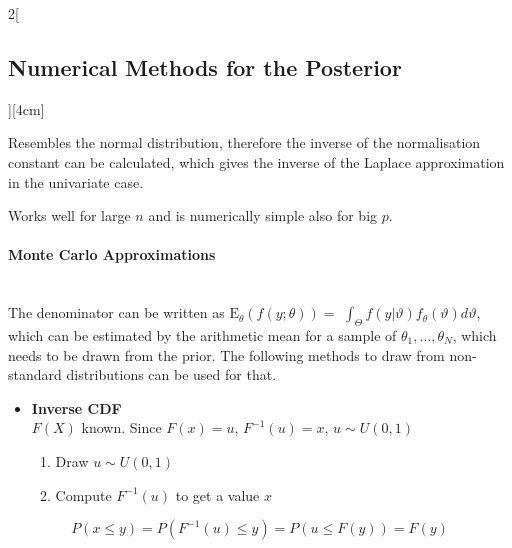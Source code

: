 \documentclass[8pt]{extarticle}
\begin{document}
\begin{multicols}{2}[\subsection{Numerical Methods for the Posterior}][4cm]
\begin{Proof}
\noindent Resembles the normal distribution, therefore the inverse of the normalisation constant can be calculated, which gives the inverse of the Laplace approximation in the univariate case.
\end{Proof}

\noindent Works well for large $n$ and is numerically simple also for big $p$.

\paragraph{Monte Carlo Approximations} \ \\

\noindent The denominator can be written as $\mathrm{E}_\theta(f(y;\theta)) =$ $ \int_\Theta f(y|\vartheta)f_\theta(\vartheta)d\vartheta$, which  can be estimated by the arithmetic mean for a sample of $\theta_1,...,\theta_N$, which needs to be drawn from the prior. The following methods to draw from non-standard distributions can be used for that.

\begin{itemize}
\item \textbf{Inverse CDF} \\
$F(X)$ known. Since $F(x)=u$, $F^{-1}(u)=x$, $u \sim U(0,1)$ \\
\vspace{-0.5em}
\begin{enumerate}
\item Draw $u \sim U(0,1)$
\item Compute $F^{-1}(u)$ to get a value $x$
\end{enumerate}
\end{itemize}
\begin{Proof}
\vspace{-1.3em}
$$P(x\leq y) = P(F^{-1}(u)\leq y) = P(u\leq F(y)) = F(y)$$
\end{Proof}


\end{multicols}
\end{document}
